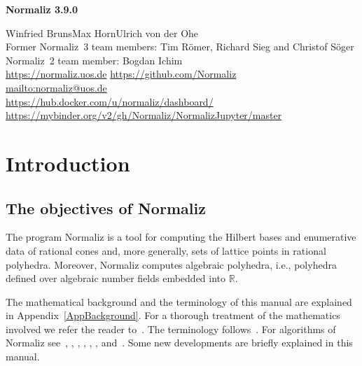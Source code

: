 \documentclass[12pt,a4paper]{scrartcl}
\theoremstyle{definition}
\def\RR{{\mathbb R}}
\def\version{3.9.0}
\begin{document}
\vspace*{2cm}

\centerline{\Large\textbf{Normaliz \version}}

\vspace*{1.5cm}

\begin{center}Winfried Bruns\qquad Max Horn\qquad Ulrich von der Ohe\\[14pt]
	Former Normaliz~3 team members: Tim R\"omer, Richard Sieg and Christof S\"oger\\[14pt]
	Normaliz~2 team member: Bogdan Ichim\\[14pt]
	\url{https://normaliz.uos.de}\qquad\qquad\qquad
	\url{https://github.com/Normaliz}\\[14pt]
	\url{mailto:normaliz@uos.de}\\[14pt]
	\url{https://hub.docker.com/u/normaliz/dashboard/}\\[14pt]
	\url{https://mybinder.org/v2/gh/Normaliz/NormalizJupyter/master}
\end{center}



\tableofcontents

\newpage

\section{Introduction}\label{facil}

\subsection{The objectives of Normaliz}

The program Normaliz is a tool for computing
the Hilbert bases and enumerative data of rational cones and, more generally, sets of lattice points in rational polyhedra. Moreover, Normaliz computes algebraic polyhedra, i.e., polyhedra defined over algebraic number fields embedded into $\RR$.

The mathematical background and the terminology of this manual are explained in Appendix~\ref{AppBackground}. For a thorough treatment of the mathematics involved we refer the reader to~\cite{BG}.
The terminology follows~\cite{BG}. For
algorithms of Normaliz see~\cite{BHIKS}, \cite{BI}, \cite{BI2},
\cite{BIS}, \cite{BK02}, \cite{BSS}, and~\cite{BS}. Some new developments are briefly explained in this manual.
\end{document}
